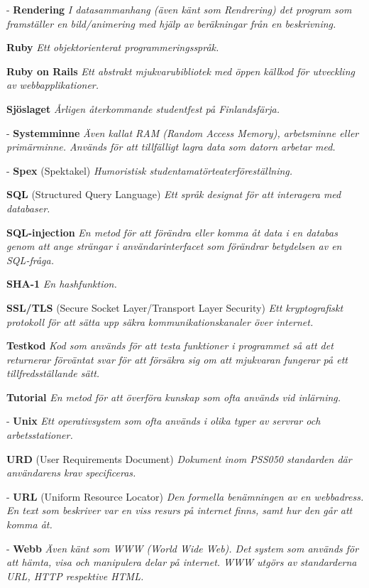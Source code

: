 \documentclass[a4paper, twoside, 11pt, titlepage]{article}
\begin{document}
	- \textbf{Rendering} \emph{I datasammanhang (även känt som Rendrering) det program som framställer en bild/animering med hjälp av beräkningar från en beskrivning.}

	\textbf{Ruby} \emph{Ett objektorienterat programmeringsspråk.}

	\textbf{Ruby on Rails} \emph{Ett abstrakt mjukvarubibliotek med öppen källkod för utveckling av webbapplikationer.}

	\textbf{Sjöslaget} \emph{Årligen återkommande studentfest på Finlandsfärja.}

	- \textbf{Systemminne} \emph{Även kallat RAM (Random Access Memory), arbetsminne eller primärminne. Används för att tillfälligt lagra data som datorn arbetar med.}

	- \textbf{Spex} (Spektakel) \emph{Humoristisk studentamatörteaterföreställning.}

	\textbf{SQL} (Structured Query Language) \emph{Ett språk designat för att interagera med databaser.}

	\textbf{SQL-injection} \emph{En metod för att förändra eller komma åt data i en databas genom att ange strängar i användarinterfacet som förändrar betydelsen av en SQL-fråga.}

	\textbf{SHA-1} \emph{En hashfunktion.}

	\textbf{SSL/TLS} (Secure Socket Layer/Transport Layer Security) \emph{Ett kryptografiskt protokoll för att sätta upp säkra kommunikationskanaler över internet.}

	\textbf{Testkod} \emph{Kod som används för att testa funktioner i programmet så att det returnerar förväntat svar för att försäkra sig om att mjukvaran fungerar på ett tillfredsställande sätt.}

	\textbf{Tutorial} \emph{En metod för att överföra kunskap som ofta används vid inlärning.}

	- \textbf{Unix} \emph{Ett operativsystem som ofta används i olika typer av servrar och arbetsstationer.}

	\textbf{URD} (User Requirements Document) \emph{Dokument inom PSS050 standarden där användarens krav specificeras.}

	- \textbf{URL} (Uniform Resource Locator) \emph{Den formella benämningen av en webbadress. En text som beskriver var en viss resurs på internet finns, samt hur den går att komma åt.}

	- \textbf{Webb} \emph{Även känt som WWW (World Wide Web). Det system som används för att hämta, visa och manipulera delar på internet. WWW utgörs av standarderna URL, HTTP respektive HTML.}
\end{document}
